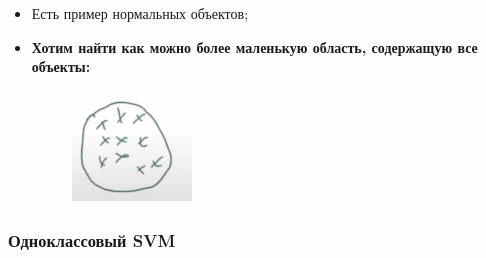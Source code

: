         \begin{itemize}
            \item Есть пример нормальных объектов;

            \item \textbf{Хотим найти как можно более маленькую область, содержащую все объекты:}

            \begin{figure}[H]
                \centering
                \includegraphics[width=0.3\textwidth]{images/19lecture/model_based_ad.png}
            \end{figure}
        \end{itemize}

        \subsubsection{Одноклассовый SVM}

